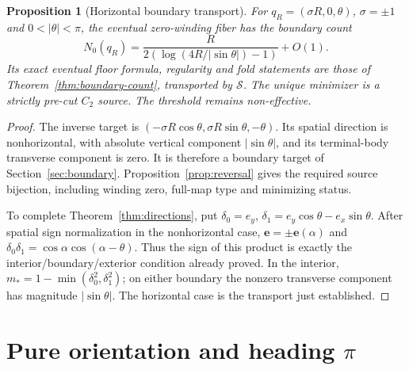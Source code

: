 \documentclass[11pt,a4paper]{article}
\newtheorem{proposition}[theorem]{Proposition}
\theoremstyle{remark}\newtheorem{remark}[theorem]{Remark}
\newcommand{\ee}{\mathbf e}
\begin{document}
\begin{proposition}[Horizontal boundary transport]\label{prop:horizontal}
For $q_R=(\sigma R,0,\theta)$, $\sigma=\pm1$ and $0<|\theta|<\pi$,
the eventual zero-winding fiber has the boundary count
\[
 N_0(q_R)=\frac{R}{2(\log(4R/|\sin\theta|)-1)}+O(1).
\]
Its exact eventual floor formula, regularity and fold statements are
those of Theorem~\ref{thm:boundary-count}, transported by $\mathcal S$.
The unique minimizer is a strictly pre-cut $C_2$ source. The threshold
remains non-effective.
\end{proposition}
\begin{proof}
The inverse target is
$(-\sigma R\cos\theta,\sigma R\sin\theta,-\theta)$. Its spatial
direction is nonhorizontal, with absolute vertical component
$|\sin\theta|$, and its terminal-body transverse component is zero.
It is therefore a boundary target of Section~\ref{sec:boundary}.
Proposition~\ref{prop:reversal} gives the required source bijection,
including winding zero, full-map type and minimizing status.

To complete Theorem~\ref{thm:directions}, put
$\delta_0=e_y$, $\delta_1=e_y\cos\theta-e_x\sin\theta$. After spatial sign
normalization in the nonhorizontal case,
$\mathbf e=\pm\ee(\alpha)$ and
$\delta_0\delta_1=\cos\alpha\cos(\alpha-\theta)$. Thus the sign of this product
is exactly the interior/boundary/exterior condition already proved.
In the interior,
$m_*=1-\min(\delta_0^2,\delta_1^2)$; on either boundary the nonzero transverse
component has magnitude $|\sin\theta|$. The horizontal case is the
transport just established.
\end{proof}

\section{Pure orientation and heading \texorpdfstring{$\pi$}{pi}}\label{sec:pi}
\end{document}
